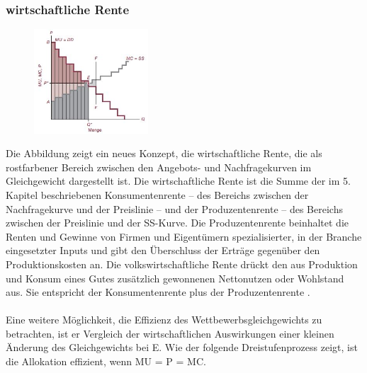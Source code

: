 \documentclass[10pt]{scrartcl}
\begin{document}
\subsubsection{wirtschaftliche Rente}
\begin{figure}
  \begin{center}
  	\vspace{-20pt}
    \includegraphics[width=0.38\textwidth]{img/allokation.jpg}
    \vspace{-20pt}
    \end{center}
\end{figure}
Die Abbildung zeigt ein neues Konzept, die wirtschaftliche Rente, die als rostfarbener Bereich zwischen den Angebots- und Nachfragekurven im Gleichgewicht dargestellt ist. Die 
wirtschaftliche Rente ist die Summe der im 5. Kapitel beschriebenen Konsumentenrente – des Bereichs zwischen der Nachfragekurve und der Preislinie – und der Produzentenrente – des Bereichs zwischen der Preislinie und der SS-Kurve. Die Produzentenrente beinhaltet die Renten und Gewinne von Firmen und Eigentümern spezialisierter, in der Branche eingesetzter Inputs und gibt den Überschluss der Erträge gegenüber den Produktionskosten an. Die volkswirtschaftliche Rente drückt den aus Produktion und Konsum eines Gutes zusätzlich gewonnenen Nettonutzen oder Wohlstand aus. Sie entspricht der Konsumentenrente plus der Produzentenrente .\\
\\
Eine weitere Möglichkeit, die Effizienz des Wettbewerbsgleichgewichts zu betrachten, ist er Vergleich der wirtschaftlichen Auswirkungen einer kleinen Änderung des Gleichgewichts bei E. Wie der folgende Dreistufenprozess zeigt, ist die Allokation effizient, wenn MU = P = MC.
\end{document}
